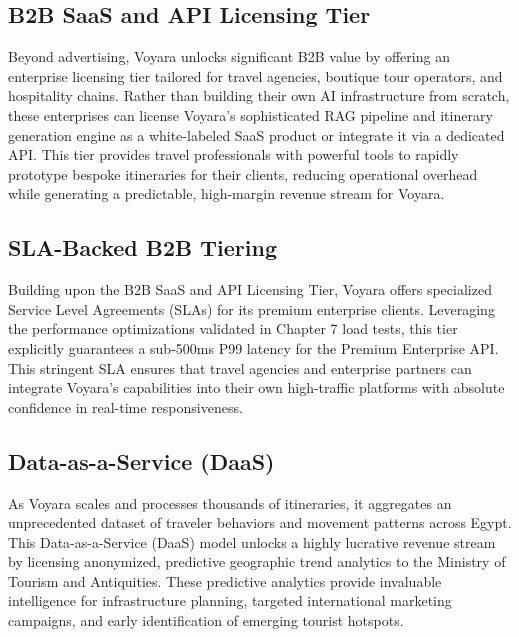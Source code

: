 \subsection{B2B SaaS and API Licensing Tier}
Beyond advertising, Voyara unlocks significant B2B value by offering an enterprise licensing tier tailored for travel agencies, boutique tour operators, and hospitality chains. Rather than building their own AI infrastructure from scratch, these enterprises can license Voyara's sophisticated RAG pipeline and itinerary generation engine as a white-labeled SaaS product or integrate it via a dedicated API. This tier provides travel professionals with powerful tools to rapidly prototype bespoke itineraries for their clients, reducing operational overhead while generating a predictable, high-margin revenue stream for Voyara.

\subsection{SLA-Backed B2B Tiering}
Building upon the B2B SaaS and API Licensing Tier, Voyara offers specialized Service Level Agreements (SLAs) for its premium enterprise clients. Leveraging the performance optimizations validated in Chapter 7 load tests, this tier explicitly guarantees a sub-500ms P99 latency for the Premium Enterprise API. This stringent SLA ensures that travel agencies and enterprise partners can integrate Voyara's capabilities into their own high-traffic platforms with absolute confidence in real-time responsiveness.

\subsection{Data-as-a-Service (DaaS)}
As Voyara scales and processes thousands of itineraries, it aggregates an unprecedented dataset of traveler behaviors and movement patterns across Egypt. This Data-as-a-Service (DaaS) \cite{daas_model} model unlocks a highly lucrative revenue stream by licensing anonymized, predictive geographic trend analytics to the Ministry of Tourism and Antiquities. These predictive analytics provide invaluable intelligence for infrastructure planning, targeted international marketing campaigns, and early identification of emerging tourist hotspots.

